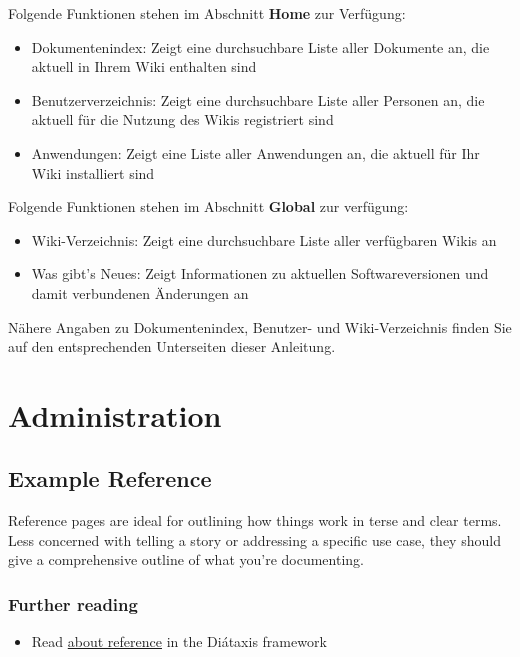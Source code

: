 \documentclass[
  letterpaper,
  DIV=11,
  numbers=noendperiod]{scrreprt}
\providecommand{\tightlist}{%
  \setlength{\itemsep}{0pt}\setlength{\parskip}{0pt}}\usepackage{longtable,booktabs,array}
\begin{document}
Folgende Funktionen stehen im Abschnitt \textbf{Home} zur Verfügung:

\begin{itemize}
\tightlist
\item
  Dokumentenindex: Zeigt eine durchsuchbare Liste aller Dokumente an,
  die aktuell in Ihrem Wiki enthalten sind
\item
  Benutzerverzeichnis: Zeigt eine durchsuchbare Liste aller Personen an,
  die aktuell für die Nutzung des Wikis registriert sind
\item
  Anwendungen: Zeigt eine Liste aller Anwendungen an, die aktuell für
  Ihr Wiki installiert sind
\end{itemize}

Folgende Funktionen stehen im Abschnitt \textbf{Global} zur verfügung:

\begin{itemize}
\tightlist
\item
  Wiki-Verzeichnis: Zeigt eine durchsuchbare Liste aller verfügbaren
  Wikis an
\item
  Was gibt's Neues: Zeigt Informationen zu aktuellen Softwareversionen
  und damit verbundenen Änderungen an
\end{itemize}

Nähere Angaben zu Dokumentenindex, Benutzer- und Wiki-Verzeichnis finden
Sie auf den entsprechenden Unterseiten dieser Anleitung.

\part{Administration}

\chapter{Example Reference}\label{example-reference}

Reference pages are ideal for outlining how things work in terse and
clear terms. Less concerned with telling a story or addressing a
specific use case, they should give a comprehensive outline of what
you're documenting.

\section{Further reading}\label{further-reading}

\begin{itemize}
\tightlist
\item
  Read \href{https://diataxis.fr/reference/}{about reference} in the
  Diátaxis framework
\end{itemize}
\end{document}
